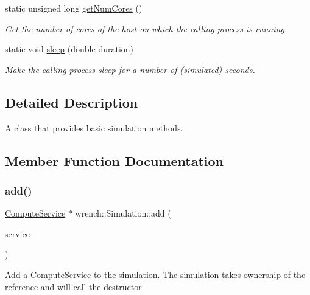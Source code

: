 \begin{DoxyCompactItemize}
static unsigned long \hyperlink{classwrench_1_1_simulation_aa5d966b1ac072a8a71db4bd527a62224}{get\+Num\+Cores} ()
\begin{DoxyCompactList}\small\item\em Get the number of cores of the host on which the calling process is running. \end{DoxyCompactList}\item 
static void \hyperlink{classwrench_1_1_simulation_a04ced81e9eb97587a2affee4e7e210ef}{sleep} (double duration)
\begin{DoxyCompactList}\small\item\em Make the calling process sleep for a number of (simulated) seconds. \end{DoxyCompactList}\end{DoxyCompactItemize}


\subsection{Detailed Description}
A class that provides basic simulation methods. 

\subsection{Member Function Documentation}
\mbox{\label{classwrench_1_1_simulation_ad1f5c12285ecfaf5a2ce7dab5ec8b4c5}} 
\subsubsection{\texorpdfstring{add()}{add()}\hspace{0.1cm}{\footnotesize\ttfamily [1/5]}}
{\footnotesize\ttfamily \hyperlink{classwrench_1_1_compute_service}{Compute\+Service} $\ast$ wrench\+::\+Simulation\+::add (\begin{DoxyParamCaption}\item[{\hyperlink{classwrench_1_1_compute_service}{Compute\+Service} $\ast$}]{service }\end{DoxyParamCaption})}



Add a \hyperlink{classwrench_1_1_compute_service}{Compute\+Service} to the simulation. The simulation takes ownership of the reference and will call the destructor. 


